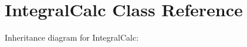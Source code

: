 \hypertarget{class_integral_calc}{}\section{Integral\+Calc Class Reference}
\label{class_integral_calc}


Inheritance diagram for Integral\+Calc\+:
